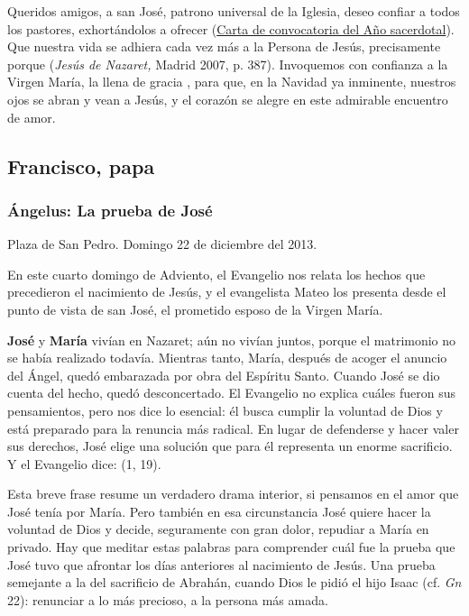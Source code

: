 \begin{body}
\begin{body}
Queridos amigos, a san José, patrono universal de la Iglesia, deseo confiar a todos los pastores, exhortándolos a ofrecer  (\href{https://www.deiverbum.org/content/benedict-xvi/es/letters/2009/documents/hf_ben-xvi_let_20090616_anno-sacerdotale.html}{Carta de convocatoria del Año sacerdotal}). Que nuestra vida se adhiera cada vez más a la Persona de Jesús, precisamente porque  (\emph{Jesús de Nazaret,} Madrid 2007, p. 387). Invoquemos con confianza a la Virgen María, la llena de gracia , para que, en la Navidad ya inminente, nuestros ojos se abran y vean a Jesús, y el corazón se alegre en este admirable encuentro de amor.

\subsection{Francisco, papa}

\subsubsection{Ángelus: La prueba de José}

Plaza de San Pedro. Domingo 22 de diciembre del 2013.

En este cuarto domingo de Adviento, el Evangelio nos relata los hechos que precedieron el nacimiento de Jesús, y el evangelista Mateo los presenta desde el punto de vista de san José, el prometido esposo de la Virgen María.

\textbf{José} y \textbf{María} vivían en Nazaret; aún no vivían juntos, porque el matrimonio no se había realizado todavía. Mientras tanto, María, después de acoger el anuncio del Ángel, quedó embarazada por obra del Espíritu Santo. Cuando José se dio cuenta del hecho, quedó desconcertado. El Evangelio no explica cuáles fueron sus pensamientos, pero nos dice lo esencial: él busca cumplir la voluntad de Dios y está preparado para la renuncia más radical. En lugar de defenderse y hacer valer sus derechos, José elige una solución que para él representa un enorme sacrificio. Y el Evangelio dice:  (1, 19).

Esta breve frase resume un verdadero drama interior, si pensamos en el amor que José tenía por María. Pero también en esa circunstancia José quiere hacer la voluntad de Dios y decide, seguramente con gran dolor, repudiar a María en privado. Hay que meditar estas palabras para comprender cuál fue la prueba que José tuvo que afrontar los días anteriores al nacimiento de Jesús. Una prueba semejante a la del sacrificio de Abrahán, cuando Dios le pidió el hijo Isaac (cf. \emph{Gn} 22): renunciar a lo más precioso, a la persona más amada.


\end{body}
\end{body}
